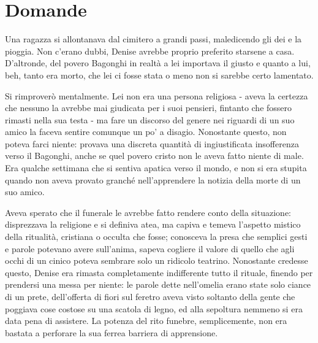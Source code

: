 \chapter{Domande}


Una ragazza si allontanava dal cimitero a grandi passi, maledicendo gli dei e la pioggia. Non c'erano dubbi, Denise avrebbe proprio preferito starsene a casa. D'altronde, del povero Bagonghi in realtà a lei importava il giusto e quanto a lui, beh, tanto era morto, che lei ci fosse stata o meno non si sarebbe certo lamentato.

Si rimproverò mentalmente. Lei non era una persona religiosa - aveva la certezza che nessuno la avrebbe mai giudicata per i suoi pensieri, fintanto che fossero rimasti nella sua testa - ma fare un discorso del genere nei riguardi di un suo amico la faceva sentire comunque un po' a disagio. Nonostante questo, non poteva farci niente: provava una discreta quantità di ingiustificata insofferenza verso il Bagonghi, anche se quel povero cristo non le aveva fatto niente di male. Era qualche settimana che si sentiva apatica verso il mondo, e non si era stupita quando non aveva provato granché nell'apprendere la notizia della morte di un suo amico.

Aveva sperato che il funerale le avrebbe fatto rendere conto della situazione: disprezzava la religione e si definiva atea, ma capiva e temeva l'aspetto mistico della ritualità, cristiana o occulta che fosse; conosceva la presa che semplici gesti e parole potevano avere sull'anima, sapeva cogliere il valore di quello che agli occhi di un cinico poteva sembrare solo un ridicolo teatrino. Nonostante credesse questo, Denise era rimasta completamente indifferente tutto il rituale, finendo per prendersi una messa per niente: le parole dette nell'omelia erano state solo ciance di un prete, dell'offerta di fiori sul feretro aveva visto soltanto della gente che poggiava cose costose su una scatola di legno, ed alla sepoltura nemmeno si era data pena di assistere. La potenza del rito funebre, semplicemente, non era bastata a perforare la sua ferrea barriera di apprensione.

